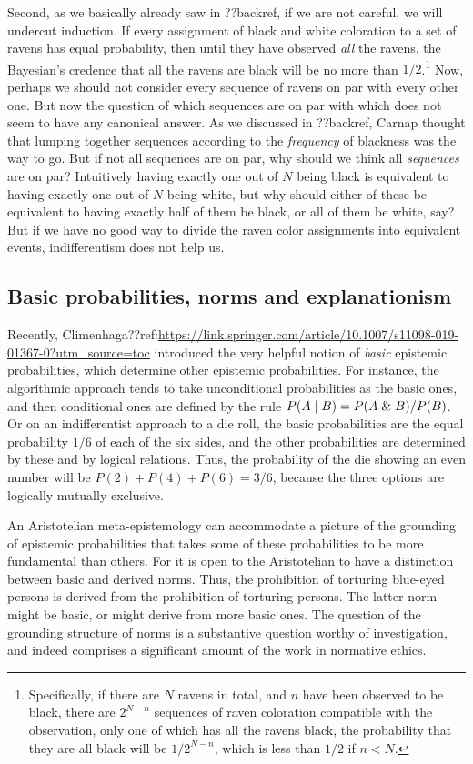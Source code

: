 Second, as we basically already saw in ??backref, if we are not careful, we will undercut induction.
If every assignment of black and white coloration to a set of ravens has equal probability, then until
they have observed \textit{all} the ravens, the Bayesian's credence that all the ravens are black will
be no more than $1/2$.\footnote{Specifically, if there are $N$ ravens in total, and $n$ have been observed 
to be black, there are $2^{N-n}$ sequences of raven coloration compatible with the observation, only
one of which has all the ravens black, the probability that they are all black will be $1/2^{N-n}$, which
is less than $1/2$ if $n<N$.} Now, perhaps we should not consider every sequence of ravens on par with 
every other one. But now the question of which sequences are on par with which does not seem to have any
canonical answer. As we discussed in ??backref, Carnap thought that lumping together sequences 
according to the \textit{frequency} of blackness was the way to go. But if not all sequences are on par,
why should we think all \textit{sequences} are on par? Intuitively having exactly one out of $N$ being black 
is equivalent to having exactly one out of $N$ being white, but why should either of these be equivalent 
to having exactly half of them be black, or all of them be white, say? But if we have no good way to 
divide the raven color assignments into equivalent events, indifferentism does not help us.

\subsection{Basic probabilities, norms and explanationism}
Recently, Climenhaga??ref:\url{https://link.springer.com/article/10.1007/s11098-019-01367-0?utm_source=toc} introduced the 
very helpful notion 
of \textit{basic} epistemic probabilities, which determine other epistemic probabilities. For instance, the 
algorithmic approach tends to take unconditional probabilities as the basic ones, and then conditional ones are 
defined by the rule $P(A\mid B)=P(A\mathrel{\&} B)/P(B)$. Or on an indifferentist approach to a die roll, the basic 
probabilities are the equal probability $1/6$ of each of the six sides, and the other probabilities are determined
by these and by logical relations. Thus, the probability of the die showing an even number will be $P(2)+P(4)+P(6)=3/6$,
because the three options are logically mutually exclusive. 

An Aristotelian meta-epistemology can accommodate a picture of the grounding of epistemic probabilities that 
takes some of these probabilities to be more fundamental than others. For it is open to the Aristotelian to have
a distinction between basic and derived norms. Thus, the prohibition of torturing blue-eyed persons is 
derived from the prohibition of torturing persons. The latter norm might be basic, or might derive from 
more basic ones. The question of the grounding structure of norms is a substantive question worthy of 
investigation, and indeed comprises a significant amount of the work in normative ethics. 

